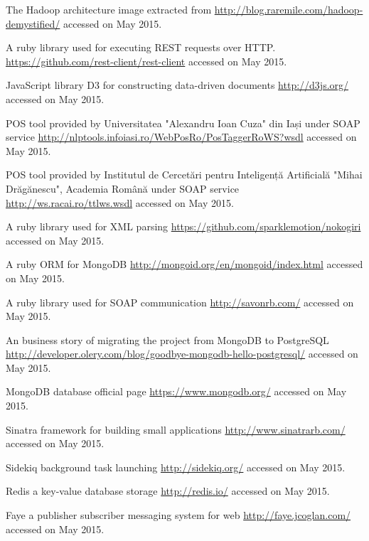 \begin{thebibliography}{99999}
\singlespace\normalsize


 The Hadoop architecture image extracted from \url{http://blog.raremile.com/hadoop-demystified/} accessed on May 2015.

 A ruby library used for executing REST requests over HTTP. \url{https://github.com/rest-client/rest-client} accessed on May 2015.

 JavaScript library D3 for constructing data-driven documents \url{http://d3js.org/} accessed on May 2015.

 POS tool provided by Universitatea "Alexandru Ioan Cuza" din Iași under SOAP service \url{http://nlptools.infoiasi.ro/WebPosRo/PosTaggerRoWS?wsdl} accessed on May 2015.

 POS tool provided by Institutul de Cercetări pentru Inteligență Artificială "Mihai Drăgănescu", Academia Română under SOAP service \url{http://ws.racai.ro/ttlws.wsdl} accessed on May 2015.

 A ruby library used for XML parsing \url{https://github.com/sparklemotion/nokogiri} accessed on May 2015.

 A ruby ORM for MongoDB \url{http://mongoid.org/en/mongoid/index.html} accessed on May 2015.

 A ruby library used for SOAP communication \url{http://savonrb.com/} accessed on May 2015.

 An business story of migrating the project from MongoDB to PostgreSQL \url{http://developer.olery.com/blog/goodbye-mongodb-hello-postgresql/} accessed on May 2015.

 MongoDB database official page \url{https://www.mongodb.org/} accessed on May 2015.

 Sinatra framework for building small applications \url{http://www.sinatrarb.com/} accessed on May 2015.

 Sidekiq background task launching \url{http://sidekiq.org/} accessed on May 2015.

 Redis a key-value database storage \url{http://redis.io/} accessed on May 2015.

 Faye a publisher subscriber messaging system for web \url{http://faye.jcoglan.com/} accessed on May 2015.

\end{thebibliography}
